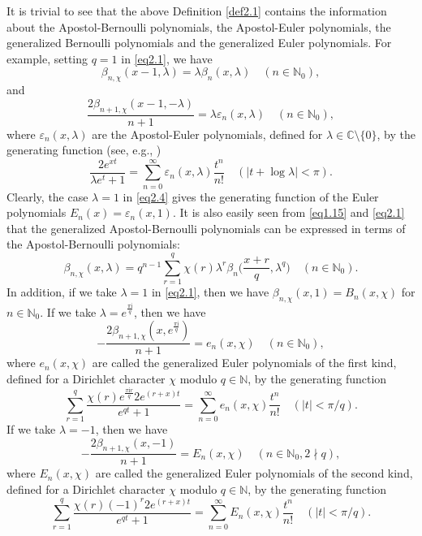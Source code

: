 \documentclass[reqno]{amsart}
\numberwithin{equation}{section}
\begin{document}
It is trivial to see that the above Definition \ref{def2.1} contains the information about the Apostol-Bernoulli polynomials, the Apostol-Euler polynomials, the generalized Bernoulli polynomials and the generalized Euler polynomials. For example, setting $q=1$ in \eqref{eq2.1}, we have
\begin{equation}\label{eq2.2}
\beta_{n,\chi}(x-1,\lambda)=\lambda\beta_{n}(x,\lambda)\quad(n\in\mathbb{N}_{0}),
\end{equation}
and
\begin{equation}\label{eq2.3}
\frac{2\beta_{n+1,\chi}(x-1,-\lambda)}{n+1}=\lambda\varepsilon_{n}(x,\lambda)\quad(n\in\mathbb{N}_{0}),
\end{equation}
where $\varepsilon_{n}(x,\lambda)$ are the Apostol-Euler polynomials, defined for $\lambda\in\mathbb{C}\setminus\{0\}$, by the generating function (see, e.g., \cite{bayad2,luo2})
\begin{equation}\label{eq2.4}
\frac{2e^{xt}}{\lambda e^{t}+1}=\sum_{n=0}^{\infty}
\varepsilon_{n}(x,\lambda)\frac{t^{n}}{n!}\quad(|t+\log\lambda|<\pi).
\end{equation}
Clearly, the case $\lambda=1$ in \eqref{eq2.4} gives the generating function of the Euler polynomials $E_{n}(x)=\varepsilon_{n}(x,1)$.
It is also easily seen from \eqref{eq1.15} and \eqref{eq2.1} that the generalized Apostol-Bernoulli polynomials can be expressed in terms of the Apostol-Bernoulli polynomials:
\begin{equation}\label{eq2.5}
\beta_{n,\chi}(x,\lambda)=q^{n-1}\sum_{r=1}^{q}\chi(r)\lambda^{r}\beta_{n}\biggl(\frac{x+r}{q},\lambda^{q}\biggl)\quad(n\in\mathbb{N}_{0}).
\end{equation}
In addition, if we take $\lambda=1$ in \eqref{eq2.1}, then we have $\beta_{n,\chi}(x,1)=B_{n}(x,\chi)$ for $n\in\mathbb{N}_{0}$. If we take $\lambda=e^{\frac{\pi \mathrm{i}}{q}}$, then we have
\begin{equation}\label{eq2.6}
-\frac{2\beta_{n+1,\chi}(x,e^{\frac{\pi \mathrm{i}}{q}})}{n+1}=e_{n}(x,\chi)\quad(n\in\mathbb{N}_{0}),
\end{equation}
where $e_{n}(x,\chi)$ are called the generalized Euler polynomials of the first kind, defined for a Dirichlet character $\chi$ modulo $q\in\mathbb{N}$, by the generating function
\begin{equation}\label{eq2.7}
\sum_{r=1}^{q}\frac{\chi(r)e^{\frac{\pi \mathrm{i}r}{q}}2e^{(r+x)t}}{e^{qt}+1}=\sum_{n=0}^{\infty}e_{n}(x,\chi)\frac{t^{n}}{n!}\quad(|t|<\pi/q).
\end{equation}
If we take $\lambda=-1$, then we have
\begin{equation}\label{eq2.8}
-\frac{2\beta_{n+1,\chi}(x,-1)}{n+1}=E_{n}(x,\chi)\quad(n\in\mathbb{N}_{0},2\nmid q),
\end{equation}
where $E_{n}(x,\chi)$ are called the generalized Euler polynomials of the second kind, defined for a Dirichlet character $\chi$ modulo $q\in\mathbb{N}$, by the generating function
\begin{equation}\label{eq2.9}
\sum_{r=1}^{q}\frac{\chi(r)(-1)^{r}2e^{(r+x)t}}{e^{qt}+1}=\sum_{n=0}^{\infty}E_{n}(x,\chi)\frac{t^{n}}{n!}\quad(|t|<\pi/q).
\end{equation}
\end{document}
